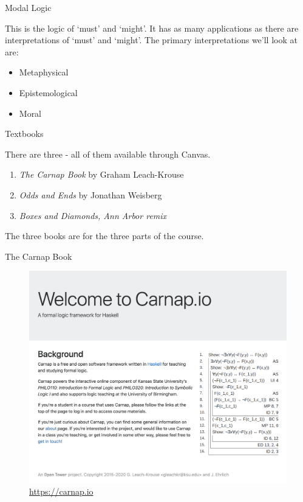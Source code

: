 \documentclass[ignorenonframetext,]{beamer}
\providecommand{\tightlist}{%
  \setlength{\itemsep}{0pt}\setlength{\parskip}{0pt}}
\renewcommand{\,}{\text{, }}
\begin{document}
\begin{frame}{Modal Logic}
\protect\hypertarget{modal-logic}{}

This is the logic of `must' and `might'. It has as many applications as
there are interpretations of `must' and `might'. The primary
interpretations we'll look at are:

\begin{itemize}
\tightlist
\item
  Metaphysical
\item
  Epistemological\\
\item
  Moral
\end{itemize}

\end{frame}

\begin{frame}{Textbooks}
\protect\hypertarget{textbooks}{}

There are three - all of them available through Canvas.

\begin{enumerate}
\tightlist
\item
  \emph{The Carnap Book} by Graham Leach-Krouse
\item
  \emph{Odds and Ends} by Jonathan Weisberg
\item
  \emph{Boxes and Diamonds, Ann Arbor remix}
\end{enumerate}

The three books are for the three parts of the course.

\end{frame}

\begin{frame}{The Carnap Book}
\protect\hypertarget{the-carnap-book}{}

\begin{figure}
\centering
\includegraphics[width=\textwidth,height=0.8\textheight]{images/0_1_a_Carnap.png}
\caption{\url{https://carnap.io}}
\end{figure}

\end{frame}
\end{document}
